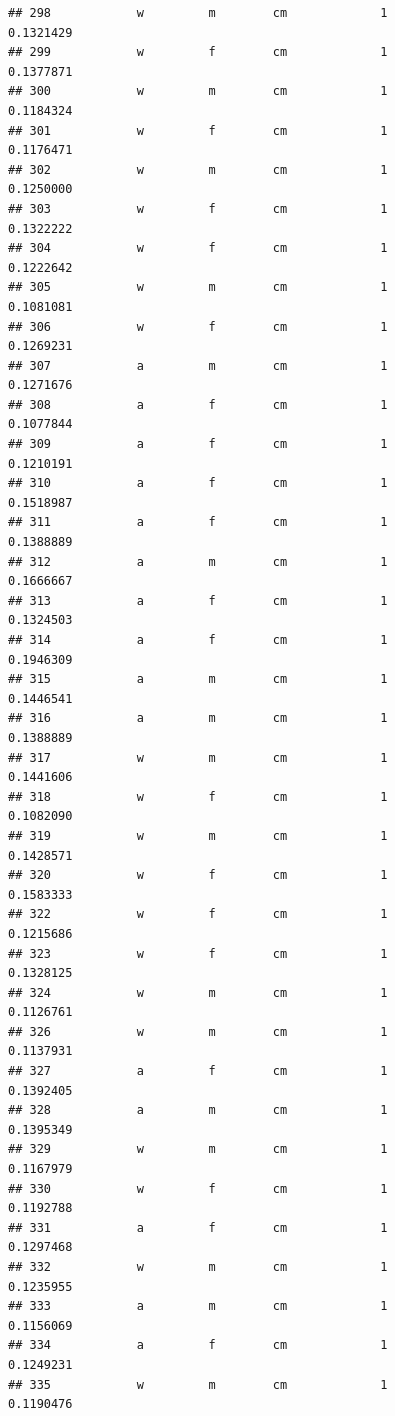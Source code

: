 \documentclass[]{article}
\begin{document}
\begin{verbatim}
## 298            w         m        cm             1          0.1321429
## 299            w         f        cm             1          0.1377871
## 300            w         m        cm             1          0.1184324
## 301            w         f        cm             1          0.1176471
## 302            w         m        cm             1          0.1250000
## 303            w         f        cm             1          0.1322222
## 304            w         f        cm             1          0.1222642
## 305            w         m        cm             1          0.1081081
## 306            w         f        cm             1          0.1269231
## 307            a         m        cm             1          0.1271676
## 308            a         f        cm             1          0.1077844
## 309            a         f        cm             1          0.1210191
## 310            a         f        cm             1          0.1518987
## 311            a         f        cm             1          0.1388889
## 312            a         m        cm             1          0.1666667
## 313            a         f        cm             1          0.1324503
## 314            a         f        cm             1          0.1946309
## 315            a         m        cm             1          0.1446541
## 316            a         m        cm             1          0.1388889
## 317            w         m        cm             1          0.1441606
## 318            w         f        cm             1          0.1082090
## 319            w         m        cm             1          0.1428571
## 320            w         f        cm             1          0.1583333
## 322            w         f        cm             1          0.1215686
## 323            w         f        cm             1          0.1328125
## 324            w         m        cm             1          0.1126761
## 326            w         m        cm             1          0.1137931
## 327            a         f        cm             1          0.1392405
## 328            a         m        cm             1          0.1395349
## 329            w         m        cm             1          0.1167979
## 330            w         f        cm             1          0.1192788
## 331            a         f        cm             1          0.1297468
## 332            w         m        cm             1          0.1235955
## 333            a         m        cm             1          0.1156069
## 334            a         f        cm             1          0.1249231
## 335            w         m        cm             1          0.1190476

\end{verbatim}
\end{document}
